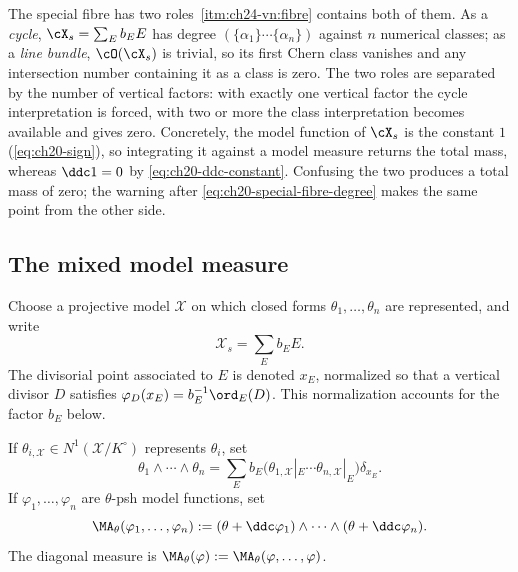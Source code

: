 \begin{warning}{The special fibre has two roles}
\,\cref{itm:ch24-vn:fibre} contains both of
them.  As a \emph{cycle}, \(\cX_s=\sum_Eb_EE\) has degree
\((\{\alpha_1\}\cdots\{\alpha_n\})\) against \(n\) numerical classes; as a
\emph{line bundle}, \(\cO(\cX_s)\) is trivial, so its first Chern class
vanishes and any intersection number containing it as a class is zero.  The
two roles are separated by the number of vertical factors: with exactly one
vertical factor the cycle interpretation is forced, with two or more the
class interpretation becomes available and gives zero.  Concretely, the
model function of \(\cX_s\) is the constant \(1\)
(\eqref{eq:ch20-sign}), so integrating it against a model measure returns the
total mass, whereas \(\ddc1=0\) by \eqref{eq:ch20-ddc-constant}.  Confusing
the two produces a total mass of zero; the warning after
\eqref{eq:ch20-special-fibre-degree} makes the same point from the other
side.
\end{warning}

\subsection{The mixed model measure}
\label{sec:ch24-mixed-model}

Choose a projective model \(\mathcal X\) on which closed forms
\(\theta_1,\ldots,\theta_n\) are represented, and write
\[
                    \mathcal X_s=\sum_E b_EE.
\]
The divisorial point associated to \(E\) is denoted \(x_E\), normalized so
that a vertical divisor \(D\) satisfies
\(\varphi_D(x_E)=b_E^{-1}\ord_E(D)\). This normalization accounts for the
factor \(b_E\) below.

\begin{definition}
\label{def:mixed-model-measure}
If \(\theta_{i,\mathcal X}\in N^1(\mathcal X/K^\circ)\) represents
\(\theta_i\), set
\begin{equation}
\label{eq:model-mixed-measure}
 \theta_1\wedge\cdots\wedge\theta_n
 =\sum_E b_E
   \bigl(\theta_{1,\mathcal X}|_E\cdots
         \theta_{n,\mathcal X}|_E\bigr)\delta_{x_E}.
\end{equation}
If \(\varphi_1,\ldots,\varphi_n\) are \(\theta\)-psh model functions, set
\[
 \MA_\theta(\varphi_1,\ldots,\varphi_n)
 :=(\theta+\ddc\varphi_1)\wedge\cdots\wedge
    (\theta+\ddc\varphi_n).
\]
The diagonal measure is
\(\MA_\theta(\varphi):=\MA_\theta(\varphi,\ldots,\varphi)\).
\end{definition}

